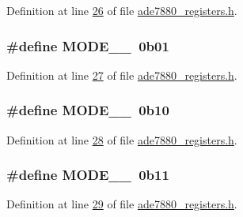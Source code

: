 Definition at line \hyperlink{a00036_source_l00026}{26} of file \hyperlink{a00036_source}{ade7880\-\_\-registers.\-h}.

\hypertarget{a00036_aa4b4d2ec825ed4a85181717901110ff7}{
\subsubsection[{M\-O\-D\-E\-\_\-0\-\_\-1}]{\setlength{\rightskip}{0pt plus 5cm}\#define M\-O\-D\-E\-\_\-\_~0b01}}\label{de/d8c/a00036_aa4b4d2ec825ed4a85181717901110ff7}


Definition at line \hyperlink{a00036_source_l00027}{27} of file \hyperlink{a00036_source}{ade7880\-\_\-registers.\-h}.

\hypertarget{a00036_a2f363ec07f38ba94cc1d74172233d801}{
\subsubsection[{M\-O\-D\-E\-\_\-1\-\_\-0}]{\setlength{\rightskip}{0pt plus 5cm}\#define M\-O\-D\-E\-\_\-\_~0b10}}\label{de/d8c/a00036_a2f363ec07f38ba94cc1d74172233d801}


Definition at line \hyperlink{a00036_source_l00028}{28} of file \hyperlink{a00036_source}{ade7880\-\_\-registers.\-h}.

\hypertarget{a00036_abfccf6bbc27bb259fc6233bc9ee591e2}{
\subsubsection[{M\-O\-D\-E\-\_\-1\-\_\-1}]{\setlength{\rightskip}{0pt plus 5cm}\#define M\-O\-D\-E\-\_\-\_~0b11}}\label{de/d8c/a00036_abfccf6bbc27bb259fc6233bc9ee591e2}


Definition at line \hyperlink{a00036_source_l00029}{29} of file \hyperlink{a00036_source}{ade7880\-\_\-registers.\-h}.

